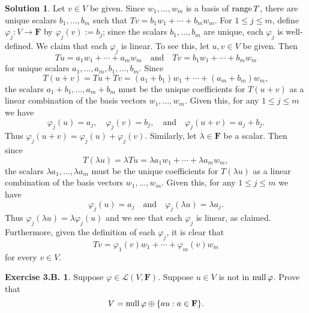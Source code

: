 \documentclass[12pt]{article}
\theoremstyle{definition}
\theoremstyle{exercise}
\newtheorem{exercise}{Exercise 3.B.}
\theoremstyle{solution}
\newtheorem*{solution}{Solution}
\newcommand{\lmap}{\mathcal{L}}
\newcommand{\Null}{\text{null\,}}
\newcommand{\Range}{\text{range\,}}
\newcommand{\quand}{\quad \text{and} \quad}
\newcommand{\F}{\mathbf{F}}
\begin{document}
\begin{solution}
    Let \( v \in V \) be given. Since \( w_1, \ldots, w_m \) is a basis of \( \Range T \), there are unique scalars \( b_1, \ldots, b_m \) such that \( Tv = b_1 w_1 + \cdots + b_m w_m \). For \( 1 \leq j \leq m \), define \( \varphi_j : V \to \F \) by \( \varphi_j(v) := b_j \); since the scalars \( b_1, \ldots, b_m \) are unique, each \( \varphi_j \) is well-defined. We claim that each \( \varphi_j \) is linear. To see this, let \( u, v \in V \) be given. Then
    \[
        Tu = a_1 w_1 + \cdots + a_m w_m \quand Tv = b_1 w_1 + \cdots + b_m w_m
    \]
    for unique scalars \( a_1, \ldots, a_m, b_1, \ldots, b_m \). Since
    \[
        T(u + v) = Tu + Tv = (a_1 + b_1) w_1 + \cdots + (a_m + b_m) w_m,
    \]
    the scalars \( a_1 + b_1, \ldots, a_m + b_m \) must be the unique coefficients for \( T(u + v) \) as a linear combination of the basis vectors \( w_1, \ldots, w_m \). Given this, for any \( 1 \leq j \leq m \) we have
    \[
        \varphi_j(u) = a_j, \quad \varphi_j(v) = b_j, \quand \varphi_j(u + v) = a_j + b_j.
    \]
    Thus \( \varphi_j(u + v) = \varphi_j(u) + \varphi_j(v) \). Similarly, let \( \lambda \in \F \) be a scalar. Then since
    \[
        T(\lambda u) = \lambda Tu = \lambda a_1 w_1 + \cdots + \lambda a_m w_m,
    \]
    the scalars \( \lambda a_1, \ldots, \lambda a_m \) must be the unique coefficients for \( T(\lambda u) \) as a linear combination of the basis vectors \( w_1, \ldots, w_m \). Given this, for any \( 1 \leq j \leq m \) we have
    \[
        \varphi_j(u) = a_j \quand \varphi_j(\lambda u) = \lambda a_j.
    \]
    Thus \( \varphi_j(\lambda u) = \lambda \varphi_j(u) \) and we see that each \( \varphi_j \) is linear, as claimed. Furthermore, given the definition of each \( \varphi_j \), it is clear that
    \[
        Tv = \varphi_1(v) w_1 + \cdots + \varphi_m(v) w_m
    \]
    for every \( v \in V \).
\end{solution}

\begin{exercise}
\label{ex:29}
    Suppose \( \varphi \in \lmap(V, \F) \). Suppose \( u \in V \) is not in \( \Null \varphi \). Prove that
    \[
        V = \Null \varphi \oplus \{ au : a \in \F \}.
    \]
\end{exercise}
\end{document}
